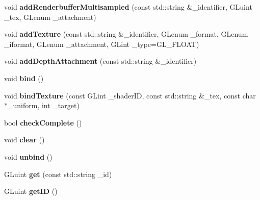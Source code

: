 \begin{DoxyCompactItemize}
\item 
\hypertarget{class_framebuffer_a978c4f74eaeb6befedb4490571bfcba1}{}void {\bfseries add\+Renderbuffer\+Multisampled} (const std\+::string \&\+\_\+identifier, G\+Luint \+\_\+tex, G\+Lenum \+\_\+attachment)\label{class_framebuffer_a978c4f74eaeb6befedb4490571bfcba1}

\item 
\hypertarget{class_framebuffer_ad528f4c2209360de2b31b0d827a07607}{}void {\bfseries add\+Texture} (const std\+::string \&\+\_\+identifier, G\+Lenum \+\_\+format, G\+Lenum \+\_\+iformat, G\+Lenum \+\_\+attachment, G\+Lint \+\_\+type=G\+L\+\_\+\+F\+L\+O\+A\+T)\label{class_framebuffer_ad528f4c2209360de2b31b0d827a07607}

\item 
\hypertarget{class_framebuffer_a0ed353e8588bcb16374bac09335c059e}{}void {\bfseries add\+Depth\+Attachment} (const std\+::string \&\+\_\+identifier)\label{class_framebuffer_a0ed353e8588bcb16374bac09335c059e}

\item 
\hypertarget{class_framebuffer_a5875dc510c665523d647026b742219a0}{}void {\bfseries bind} ()\label{class_framebuffer_a5875dc510c665523d647026b742219a0}

\item 
\hypertarget{class_framebuffer_ab7e59b32a393df0bd05a029a4b469d37}{}void {\bfseries bind\+Texture} (const G\+Lint \+\_\+shader\+I\+D, const std\+::string \&\+\_\+tex, const char $\ast$\+\_\+uniform, int \+\_\+target)\label{class_framebuffer_ab7e59b32a393df0bd05a029a4b469d37}

\item 
\hypertarget{class_framebuffer_a9358db7f628159f5ba16e82343c5a841}{}bool {\bfseries check\+Complete} ()\label{class_framebuffer_a9358db7f628159f5ba16e82343c5a841}

\item 
\hypertarget{class_framebuffer_a29f3edfceab261b122f09a8a1b067b41}{}void {\bfseries clear} ()\label{class_framebuffer_a29f3edfceab261b122f09a8a1b067b41}

\item 
\hypertarget{class_framebuffer_ad33c86c5ae1b508306464077f7425683}{}void {\bfseries unbind} ()\label{class_framebuffer_ad33c86c5ae1b508306464077f7425683}

\item 
\hypertarget{class_framebuffer_a711c61b91f56d36d1bc5650ca5f82d72}{}G\+Luint {\bfseries get} (const std\+::string \+\_\+id)\label{class_framebuffer_a711c61b91f56d36d1bc5650ca5f82d72}

\item 
\hypertarget{class_framebuffer_a326f3e89e2cab64ac78dd02de22f3f52}{}G\+Luint {\bfseries get\+I\+D} ()\label{class_framebuffer_a326f3e89e2cab64ac78dd02de22f3f52}

\end{DoxyCompactItemize}


